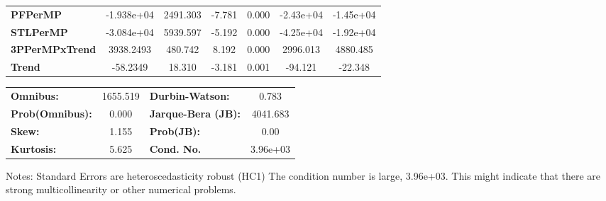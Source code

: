 \begin{center}
\begin{tabular}{lcccccc}
\textbf{PFPerMP}       &   -1.938e+04  &     2491.303     &    -7.781  &         0.000        &    -2.43e+04    &    -1.45e+04     \\
\textbf{STLPerMP}      &   -3.084e+04  &     5939.597     &    -5.192  &         0.000        &    -4.25e+04    &    -1.92e+04     \\
\textbf{3PPerMPxTrend} &    3938.2493  &      480.742     &     8.192  &         0.000        &     2996.013    &     4880.485     \\
\textbf{Trend}         &     -58.2349  &       18.310     &    -3.181  &         0.001        &      -94.121    &      -22.348     \\
\bottomrule
\end{tabular}
\begin{tabular}{lclc}
\textbf{Omnibus:}       & 1655.519 & \textbf{  Durbin-Watson:     } &    0.783  \\
\textbf{Prob(Omnibus):} &   0.000  & \textbf{  Jarque-Bera (JB):  } & 4041.683  \\
\textbf{Skew:}          &   1.155  & \textbf{  Prob(JB):          } &     0.00  \\
\textbf{Kurtosis:}      &   5.625  & \textbf{  Cond. No.          } & 3.96e+03  \\
\bottomrule
\end{tabular}
\end{center}

Notes: \newline
 [1] Standard Errors are heteroscedasticity robust (HC1) \newline
 [2] The condition number is large, 3.96e+03. This might indicate that there are \newline
 strong multicollinearity or other numerical problems.